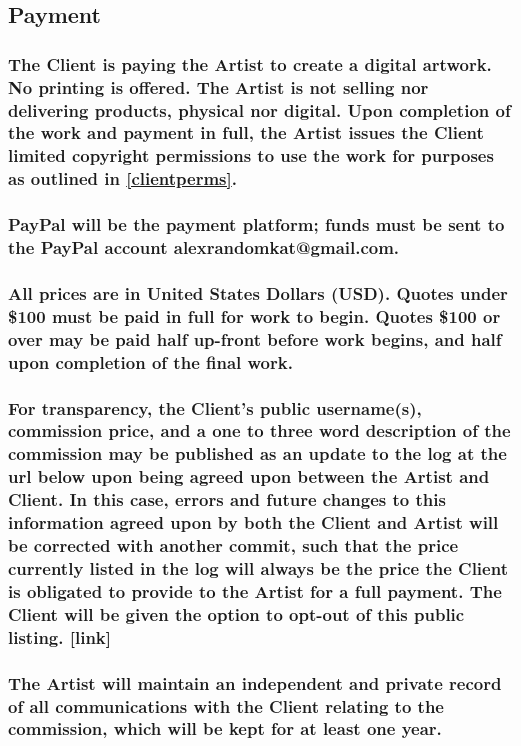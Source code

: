 \documentclass{article}
\begin{document}
\begin{flushleft}
	\leftskip=1cm
	\subsection{Payment} 
	\leftskip=2cm
		\subsubsection[Payment for a Service]{\normalfont The Client is paying the Artist to create a digital artwork. No printing is offered. The Artist is not selling nor delivering products, physical nor digital. Upon completion of the work and payment in full, the Artist issues the Client limited copyright permissions to use the work for purposes as outlined in \ref{clientperms}.}

		\subsubsection[Acceptable Payment Methods]{\normalfont PayPal will be the payment platform; funds must be sent to the PayPal account alexrandomkat@gmail.com.}

		\subsubsection[Payment Plans]{\normalfont All prices are in United States Dollars (USD). Quotes under \$100 must be paid in full for work to begin. Quotes \$100 or over may be paid half up-front before work begins, and half upon completion of the final work.}

		\subsubsection[Public Recordkeeping]{\normalfont For transparency, the Client's public username(s), commission price, and a one to three word description of the commission may be published as an update to the log at the url below upon being agreed upon between the Artist and Client. In this case, errors and future changes to this information agreed upon by both the Client and Artist will be corrected with another commit, such that the price currently listed in the log will always be the price the Client is obligated to provide to the Artist for a full payment. The Client will be given the option to opt-out of this public listing. [link] }
		
		\subsubsection[Private Recordkeeping]{\normalfont The Artist will maintain an independent and private record of all communications with the Client relating to the commission, which will be kept for at least one year.}
		\hphantom{owo}
		

\end{flushleft}
\end{document}
